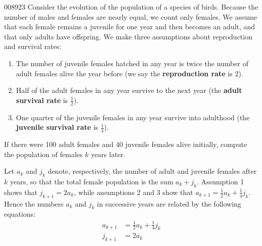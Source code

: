 \begin{example}{}{008923}
Consider
 the evolution of the population of a species of birds. Because the 
number of males and females are nearly equal, we count only females. We 
assume that each female remains a juvenile for one year and then becomes
 an adult, and that only adults have offspring. We make three 
assumptions about reproduction and survival rates:


\begin{enumerate}
\item The number of juvenile females hatched in any year is twice the number of adult females alive the year before (we say the \textbf{reproduction rate} is 2).

\item Half of the adult females in any year survive to the next year (the \textbf{adult survival rate} is $\frac{1}{2}$).

\item One quarter of the juvenile females in any year survive into adulthood (the \textbf{juvenile survival rate} is $\frac{1}{4}$).

\end{enumerate}

If there were 100 adult females and 40 juvenile females alive initially, compute the population of females $k$ years later.


\begin{solution}
  Let $a_{k}$ and $j_{k}$ denote, respectively, the number of adult and juvenile females after $k$ years, so that the total female population is the sum $a_{k} + j_{k}$. Assumption 1 shows that $j_{k+1} = 2a_{k}$, while assumptions 2 and 3 show that $a_{k+1} = \frac{1}{2}a_{k} + \frac{1}{4}j_{k}$. Hence the numbers $a_{k}$ and $j_{k}$ in successive years are related by the following equations:
\begin{align*}
a_{k+1} & = \frac{1}{2} a_k + \frac{1}{4} j_k \\
j_{k+1} & = 2 a_k 
\end{align*}


\end{solution}
\end{example}
